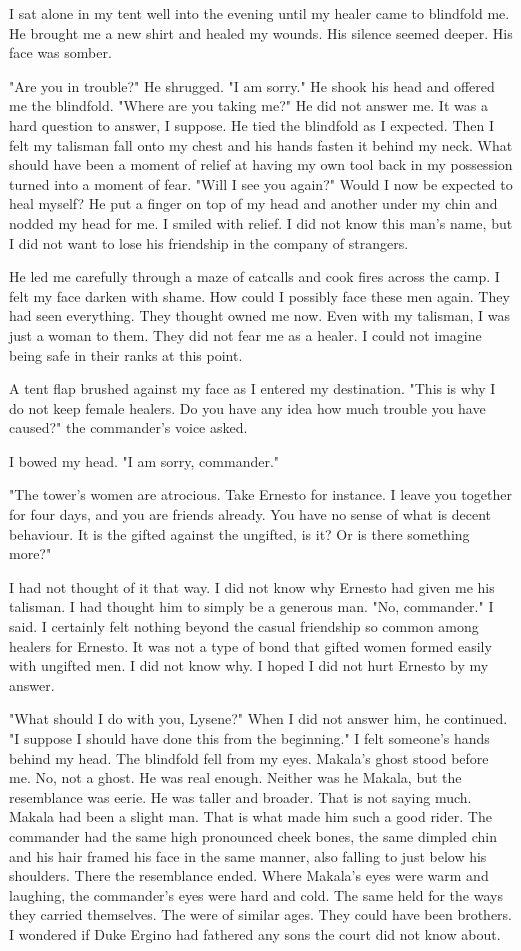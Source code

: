 \documentclass{article}
\begin{document}
I sat alone in my tent well into the evening until my healer came to blindfold me. He brought me a new shirt and healed my wounds. His silence seemed deeper. His face was somber. 

"Are you in trouble?" He shrugged. "I am sorry." He shook his head and offered me the blindfold. "Where are you taking me?" He did not answer me. It was a hard question to answer, I suppose. He tied the blindfold as I expected. Then I felt my talisman fall onto my chest and his hands fasten it behind my neck. What should have been a moment of relief at having my own tool back in my possession turned into a moment of fear. "Will I see you again?" Would I now be expected to heal myself? He put a finger on top of my head and another under my chin and nodded my head for me. I smiled with relief. I did not know this man's name, but I did not want to lose his friendship in the company of strangers.

He led me carefully through a maze of catcalls and cook fires across the camp. I felt my face darken with shame. How could I possibly face these men again. They had seen everything. They thought owned me now. Even with my talisman, I was just a woman to them. They did not fear me as a healer. I could not imagine being safe in their ranks at this point. 

A tent flap brushed against my face as I entered my destination. "This is why I do not keep female healers. Do you have any idea how much trouble you have caused?" the commander's voice asked.

I bowed my head. "I am sorry, commander."

"The tower's women are atrocious. Take Ernesto for instance. I leave you together for four days, and you are friends already. You have no sense of what is decent behaviour. It is the gifted against the ungifted, is it? Or is there something more?"

I had not thought of it that way. I did not know why Ernesto had given me his talisman. I had thought him to simply be a generous man. "No, commander." I said. I certainly felt nothing beyond the casual friendship so common among healers for Ernesto. It was not a type of bond that gifted women formed easily with ungifted men. I did not know why. I hoped I did not hurt Ernesto by my answer.

"What should I do with you, Lysene?" When I did not answer him, he continued. "I suppose I should have done this from the beginning." I felt someone's hands behind my head. The blindfold fell from my eyes. Makala's ghost stood before me. No, not a ghost. He was real enough. Neither was he Makala, but the resemblance was eerie. He was taller and broader. That is not saying much. Makala had been a slight man. That is what made him such a good rider. The commander had the same high pronounced cheek bones, the same dimpled chin and his hair framed his face in the same manner, also falling to just below his shoulders. There the resemblance ended. Where Makala's eyes were warm and laughing, the commander's eyes were hard and cold. The same held for the ways they carried themselves. The were of similar ages. They could have been brothers. I wondered if Duke Ergino had fathered any sons the court did not know about.
\end{document}
